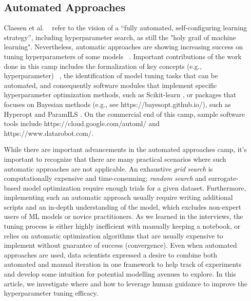 \documentclass[preprint]{vgtc}        %
\begin{document}
\subsection{Automated Approaches} 
Claesen et al. ~\cite{Claesen2014EasyOptunity} refer to the vision of a “fully automated, self-configuring learning strategy”, including hyperparameter search, as still the "holy grail of machine learning". Nevertheless, automatic approaches are showing increasing success on tuning hyperparameters of some models ~\cite{YogatamaEfficientTuning,Bardenet2013CollaborativeTuning}. Important contributions of the work done in this camp includes the formalization of key concepts (e.g., hyperparameter) ~\cite{Claesen2015HyperparameterLearning}, the identification of model tuning tasks that can be automated, and consequently software modules that implement specific hyperparameter optimization methods, such as Scikit-learn \cite{Pedregosa2011Scikit-learn:Python}, or packages that focuses on Bayesian methods (e.g., see https://bayesopt.github.io/), such as Hyperopt \cite{BergstraAlgorithmsOptimization} and ParamILS \cite{Hutter2009ParamILS:StutzleStStutzle}.
On the commercial end of this camp, sample software tools include https://cloud.google.com/automl/ and https://www.datarobot.com/. 

While there are important advancements in the automated approaches camp, it's important to recognize that there are many practical scenarios where such automatic approaches are not applicable. An exhaustive \textit{grid search} is computationally expensive and time-consuming; \textit{random search} and surrogate-based model optimization require enough trials for a given dataset. Furthermore, implementing such an automatic approach usually require writing additional scripts and an in-depth understanding of the model, which excludes non-expert users of ML models or novice practitioners. 
As we learned in the interviews, the tuning process is either highly inefficient with manually keeping a notebook, or relies on automatic optimization algorithms that are usually expensive to implement without guarantee of success (convergence). Even when automated approaches are used, data scientists expressed a desire to combine both automated and manual iteration in one framework to help track of experiments and develop some intuition for potential modelling avenues to explore. In this article, we investigate where and how to leverage human guidance to improve the hyperparameter tuning efficacy.
\end{document}

